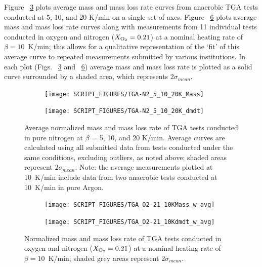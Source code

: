 \documentclass{book}
\begin{document}
Figure ~\ref{Fig:TGA-N2_5_10_20K} plots average mass and mass loss rate curves from anaerobic TGA tests conducted at 5, 10, and 20 K/min on a single set of axes. Figure ~\ref{Fig:TGA_O2-21_10K_w_avg} plots average mass and mass loss rate curves along with measurements from 11 individual tests conducted in oxygen and nitrogen ($X_{\rm O_2}=0.21$) at a nominal heating rate of $\beta=10$~K/min; this allows for a qualitative representation of the ‘fit’ of this average curve to repeated measurements submitted by various institutions. In each plot (Figs. ~\ref{Fig:TGA-N2_5_10_20K} and ~\ref{Fig:TGA_O2-21_10K_w_avg}) average mass and mass loss rate is plotted as a solid curve surrounded by a shaded area, which represents $2\sigma_{mean}$.

\begin{figure}
\centering
\begin{subfigure}[b]{0.85\textwidth}
   \texttt{[image: SCRIPT\_FIGURES/TGA-N2\_5\_10\_20K\_Mass]}
   \caption{}
   \label{Fig:TGA-N2_5_10_20K_Mass}
\end{subfigure}

\begin{subfigure}[b]{0.85\textwidth}
   \texttt{[image: SCRIPT\_FIGURES/TGA-N2\_5\_10\_20K\_dmdt]}
   \caption{}
   \label{Fig:TGA-N2_5_10_20K_dmdt}
\end{subfigure}

  \caption{Average normalized mass and mass loss rate of TGA tests conducted in pure nitrogen at $\beta$ = 5, 10, and 20 K/min. Average curves are calculated using all submitted data from tests conducted under the same conditions, excluding outliers, as noted above; shaded areas represent $2\sigma_{mean}$. Note: the average measurements plotted at 10~K/min include data from two anaerobic tests conducted at 10~K/min in pure Argon.}
  \label{Fig:TGA-N2_5_10_20K}
\end{figure}


\begin{figure}
\centering
\begin{subfigure}[b]{0.85\textwidth}
   \texttt{[image: SCRIPT\_FIGURES/TGA\_O2-21\_10KMass\_w\_avg]}
   \caption{}
   \label{Fig:TGA_O2-21_10KMass_w_avg}
\end{subfigure}

\begin{subfigure}[b]{0.85\textwidth}
   \texttt{[image: SCRIPT\_FIGURES/TGA\_O2-21\_10Kdmdt\_w\_avg]}
   \caption{}
   \label{Fig:TGA_O2-21_10Kdmdt_w_avg}
\end{subfigure}

  \caption{Normalized mass and mass loss rate of TGA tests conducted in oxygen and nitrogen ($X_{\rm O_2}=0.21$) at a nominal heating rate of $\beta=10$~K/min; shaded grey areas represent $2\sigma_{mean}$.}
  \label{Fig:TGA_O2-21_10K_w_avg}
\end{figure}
\end{document}

